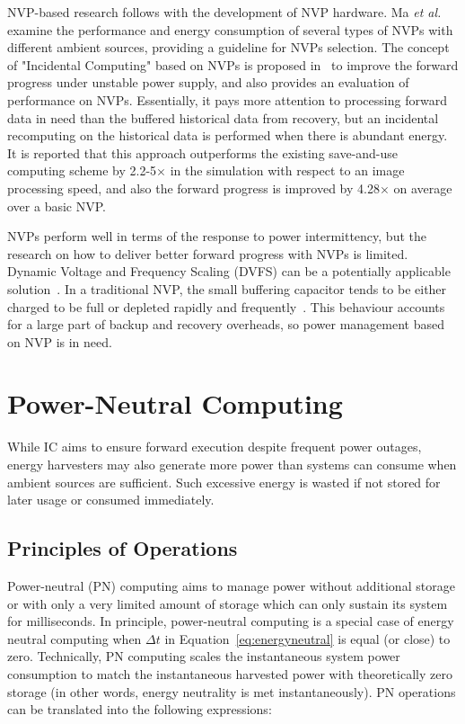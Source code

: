 NVP-based research follows with the development of NVP hardware. Ma \textit{et al.}~\cite{ma2015architecture} examine the performance and energy consumption of several types of NVPs with different ambient sources, providing a guideline for NVPs selection. The concept of "Incidental Computing" based on NVPs is proposed in~\cite{ma2017incidental} to improve the forward progress under unstable power supply, and also provides an evaluation of performance on NVPs. Essentially, it pays more attention to processing forward data in need than the buffered historical data from recovery, but an incidental recomputing on the historical data is performed when there is abundant energy. It is reported that this approach outperforms the existing save-and-use computing scheme by 2.2-5$\times$ in the simulation with respect to an image processing speed, and also the forward progress is improved by 4.28$\times$ on average over a basic NVP.

NVPs perform well in terms of the response to power intermittency, but the research on how to deliver better forward progress with NVPs is limited. Dynamic Voltage and Frequency Scaling (DVFS) can be a potentially applicable solution~\cite{ma2016nonvolatile}. In a traditional NVP, the small buffering capacitor tends to be either charged to be full or depleted rapidly and frequently~\cite{su2017nonvolatile}. This behaviour accounts for a large part of backup and recovery overheads, so power management based on NVP is in need.

\section{Power-Neutral Computing} \label{Section:PN}

While IC aims to ensure forward execution despite frequent power outages, energy harvesters may also generate more power than systems can consume when ambient sources are sufficient. Such excessive energy is wasted if not stored for later usage or consumed immediately. 

\subsection{Principles of Operations}

Power-neutral (PN) computing aims to manage power without additional storage or with only a very limited amount of storage which can only sustain its system for milliseconds. In principle, power-neutral computing is a special case of energy neutral computing when $\Delta t$ in Equation~\ref{eq:energyneutral} is equal (or close) to zero. Technically, PN computing scales the instantaneous system power consumption to match the instantaneous harvested power with theoretically zero storage (in other words, energy neutrality is met instantaneously). PN operations can be translated into the following expressions:

